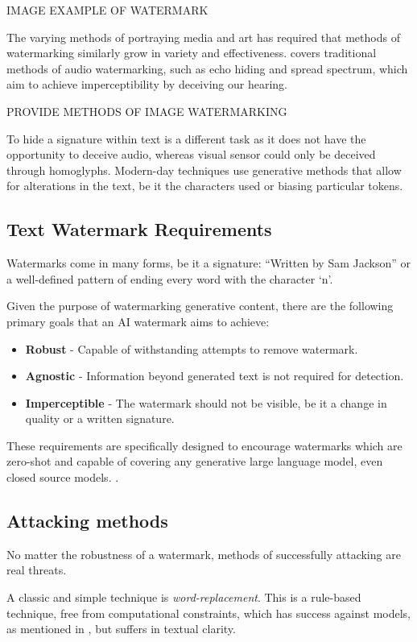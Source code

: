 \documentclass{l4proj}
\theoremstyle{definition}
\begin{document}
        IMAGE EXAMPLE OF WATERMARK

        The varying methods of portraying media and art has required that methods of watermarking similarly grow in variety and effectiveness. \citet{xiang2017digital} covers traditional methods of audio watermarking, such as echo hiding and spread spectrum, which aim to achieve imperceptibility by deceiving our hearing. 
        
        PROVIDE METHODS OF IMAGE WATERMARKING 

        To hide a signature within text is a different task as it does not have the opportunity to deceive audio, whereas visual sensor could only be deceived through homoglyphs.
        Modern-day techniques use generative methods that allow for alterations in the text, be it the characters used or biasing particular tokens.
    \subsection{Text Watermark Requirements}
         Watermarks come in many forms, be it a signature: ``Written by Sam Jackson'' or a well-defined pattern of ending every word with the character `n'.
         
         Given the purpose of watermarking generative content, there are the following primary goals that an AI watermark aims to achieve:
         \begin{itemize}
            \setlength\itemsep{0.5em}
            \item \textbf{Robust} - Capable of withstanding attempts to remove watermark.
            \item \textbf{Agnostic} - Information beyond generated text is not required for detection.
            \item \textbf{Imperceptible} - The watermark should not be visible, be it a change in quality or a written signature.
        \end{itemize}
        These requirements are specifically designed to encourage watermarks which are zero-shot and capable of covering any generative large language model, even closed source models. \cite{perhaps an example/rewrite this}.
    \subsection{Attacking methods}
        No matter the robustness of a watermark, methods of successfully attacking are real threats. 

        A classic and simple technique is \emph{word-replacement}. This is a rule-based technique, free from computational constraints, which has success against models, as mentioned in \cite{reference here}, but suffers in textual clarity.
\end{document}
